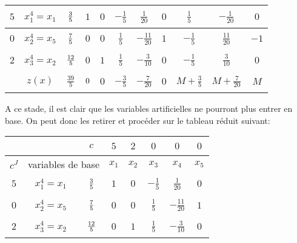 \begin{td-sol}[]
\begin{enumerate}
\begin{center}
\begin{tabular}{|ccc|cccccccc|}
                \hline %
                \multicolumn{1}{|c|}{\(5\)}& \multicolumn{1}{c|}{\(x_1^{4}=x_1\)} &\(\vphantom{\dfrac16}\frac{3}{5}\)&\(1\)&\(0\)&\(-\frac{1}{5}\)&\(\frac{1}{20}\)&\(0\)&\(\frac{1}{5}\)&\(-\frac{1}{20}\)&\(0\)\\
                \hline %
                \multicolumn{1}{|c|}{\(0\)}& \multicolumn{1}{c|}{\(x_2^{4}=x_5\)} &\(\vphantom{\dfrac16}\frac{7}{5}\)&\(0\)&\(0\)&\(\frac{1}{5}\)&\(-\frac{11}{20}\)&\(1\)&\(-\frac{1}{5}\)&\(\frac{11}{20}\)&\(-1\)\\
                \hline %
                \multicolumn{1}{|c|}{\(2\)}& \multicolumn{1}{c|}{\(x_3^{4}=x_2\)} &\(\vphantom{\dfrac16}\frac{12}{5}\)&\(0\)&\(1\)&\(\frac{1}{5}\)&\(-\frac{3}{10}\)&\(0\)&\(-\frac{1}{5}\)&\(\frac{3}{10}\)&\(0\)\\
                \hline %
                \multicolumn{1}{|c|}{} &\(z(x)\)& \multicolumn{1}{|c|}{\(\frac{39}{5}\)} &\(\vphantom{\dfrac16}0\)&\(0\)&\(-\frac{3}{5}\)&\(-\frac{7}{20}\)&\(0\)&\(M+\frac{3}{5}\)&\(M+\frac{7}{20}\)&\(M\)\\
                \hline %
            \end{tabular}
        \end{center}
        A ce stade, il est clair que les variables artificielles ne pourront plus entrer en base.
        On peut donc les retirer et procéder sur le tableau réduit suivant:
        \begin{center}
            \begin{tabular}{|ccc|ccccc|} %
                \hline  %
                & \ &\(c\)&\(5\)&\(2\)&\(0\)&\(0\)&\(0\)\\
                \hline %
                \multicolumn{1}{|c|}{\(c^J\)}& \multicolumn{2}{c|}{variables de base}&\(x_1\)&\(x_2\)&\(x_3\)&\(x_4\)&\(x_5\)\\
                \hline %
                \multicolumn{1}{|c|}{\(5\)}& \multicolumn{1}{c|}{\(x_1^{4}=x_1\)} &\(\vphantom{\dfrac16}\frac{3}{5}\)&\(1\)&\(0\)&\(-\frac{1}{5}\)&\(\frac{1}{20}\)&\(0\)\\
                \hline %
                \multicolumn{1}{|c|}{\(0\)}& \multicolumn{1}{c|}{\(x_2^{4}=x_5\)} &\(\vphantom{\dfrac16}\frac{7}{5}\)&\(0\)&\(0\)&\(\frac{1}{5}\)&\(-\frac{11}{20}\)&\(1\)\\
                \hline %
                \multicolumn{1}{|c|}{\(2\)}& \multicolumn{1}{c|}{\(x_3^{4}=x_2\)} &\(\vphantom{\dfrac16}\frac{12}{5}\)&\(0\)&\(1\)&\(\frac{1}{5}\)&\(-\frac{3}{10}\)&\(0\)\\

\end{tabular}
\end{center}
\end{enumerate}
\end{td-sol}
